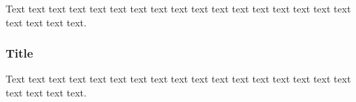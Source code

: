 \documentclass[preprint]{iucr}              %
\begin{document}
Text text text text text text text text text text text text text text
text text text text text text text.

\subsubsection{Title}

Text text text text text text text text text text text text text text
text text text text text text text.









\end{document}
